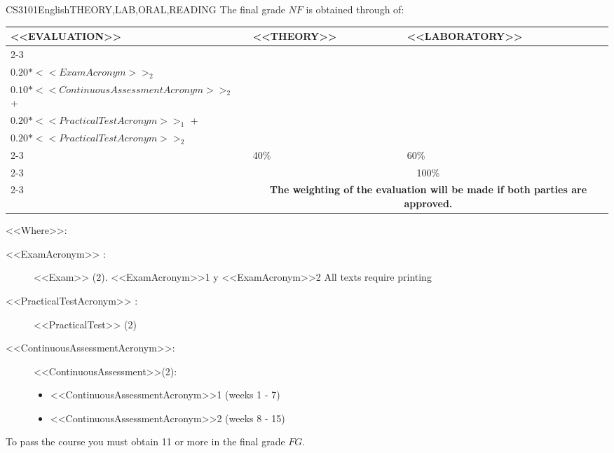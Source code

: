   \begin{evaluation}{CS3101}{English}{THEORY,LAB,ORAL,READING}
  The final grade $NF$ is obtained through of:\\
 
  \begin{tabularx}{0.9\textwidth}{|X|p{}|p{}|} \hline
    \multirow{4}{*}{\uppercase{<<Evaluation>>}} & \uppercase{<<Theory>>} & \uppercase{<<Laboratory>>} \\ \cline{2-3}
    & %
        \begin{minipage}{0.95\textwidth}
        \begin{tabular}{l}
          $0.20*<<ExamAcronym>>_{1}$  + \\
          $0.20*<<ExamAcronym>>_{2}$ 
        \end{tabular} 
        \end{minipage} 
    & %
        \begin{minipage}{0.95\textwidth}
        \begin{tabular}{l}
          $0.10*<<ContinuousAssessmentAcronym>>_{1}$  + \\
          $0.10*<<ContinuousAssessmentAcronym>>_{2}$  + \\
          $0.20*<<PracticalTestAcronym>>_{1}$  +  \\
          $0.20*<<PracticalTestAcronym>>_{2}$
        \end{tabular} 
        \end{minipage}                 \\ \cline{2-3}
    
    & %
    40\% 
    & %
    60\% \\ \cline{2-3}
    & \multicolumn{2}{c|}{100\%}  \\ \cline{2-3}
    & \multicolumn{2}{c|}{\textbf{The weighting of the evaluation will be made if both parties are approved.}}  \\ \hline
    \end{tabularx}
      
    \vspace{2mm}
    \noindent <<Where>>:
    \begin{description}
      \item[<<ExamAcronym>> :] <<Exam>> (2). <<ExamAcronym>>1 y <<ExamAcronym>>2  All texts require printing
      \item[<<PracticalTestAcronym>> :] <<PracticalTest>> (2)
      \item[<<ContinuousAssessmentAcronym>>:]<<ContinuousAssessment>>(2):
        \begin{itemize}
          \item <<ContinuousAssessmentAcronym>>1 (weeks 1 - 7) 
            \item <<ContinuousAssessmentAcronym>>2 (weeks 8 - 15)
        \end{itemize}
    \end{description}

   \noindent To pass the course you must obtain 11 or more in the final grade $FG$.
  \end{evaluation}


